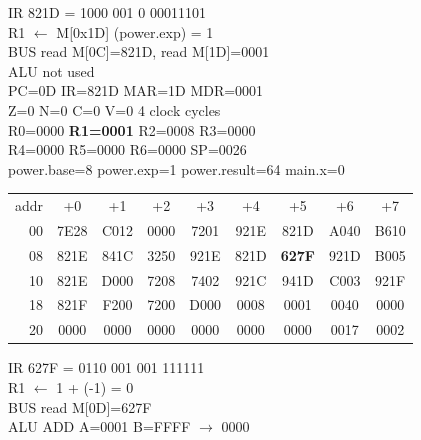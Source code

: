 \noindent\begin{tcolorbox}[stepbox, title={Step 28 \hfill PC 0C \quad LD R1, power.exp}]
\textcolor{dim}{IR} 821D = 1000 001 0 00011101\\
R1 $\leftarrow$ M[0x1D] (power.exp) = 1\\
\textcolor{dim}{BUS} read M[0C]=821D, read M[1D]=0001\\
\textcolor{dim}{ALU} \textcolor{dim}{not used}\\
PC=0D IR=821D MAR=1D MDR=0001\\
Z=0 N=0 C=0 V=0 \hfill \textcolor{dim}{4 clock cycles}\\
R0=0000 \textcolor{wrt}{\textbf{R1=0001}} R2=0008 R3=0000\\
R4=0000 R5=0000 R6=0000 SP=0026\\
\textcolor{dim}{power.base=8  power.exp=1  power.result=64  main.x=0}\\[1pt]
{\setlength{\tabcolsep}{1.6pt}\begin{tabular}{@{}r*{8}{c}@{}}
\textcolor{dim}{addr} & \textcolor{dim}{+0} & \textcolor{dim}{+1} & \textcolor{dim}{+2} & \textcolor{dim}{+3} & \textcolor{dim}{+4} & \textcolor{dim}{+5} & \textcolor{dim}{+6} & \textcolor{dim}{+7}\\
\textcolor{dim}{00} & 7E28 & C012 & 0000 & 7201 & 921E & 821D & A040 & B610\\
\textcolor{dim}{08} & 821E & 841C & 3250 & 921E & 821D & \cellcolor{pcc}\textbf{627F} & 921D & B005\\
\textcolor{dim}{10} & 821E & D000 & 7208 & 7402 & 921C & 941D & C003 & 921F\\
\textcolor{dim}{18} & 821F & F200 & 7200 & D000 & \cellcolor{datac}0008 & \cellcolor{datac}0001 & \cellcolor{datac}0040 & \cellcolor{datac}0000\\
\textcolor{dim}{20} & \cellcolor{stackc}0000 & \cellcolor{stackc}0000 & \cellcolor{stackc}0000 & \cellcolor{stackc}0000 & \cellcolor{stackc}0000 & \cellcolor{stackc}0000 & \cellcolor{stackc}0017 & \cellcolor{stackc}0002\\
\end{tabular}}
\end{tcolorbox}\hfill\begin{tcolorbox}[stepbox, title={Step 29 \hfill PC 0D \quad ADDI R1, R1, -1}]
\textcolor{dim}{IR} 627F = 0110 001 001 111111\\
R1 $\leftarrow$ 1 + (-1) = 0\\
\textcolor{dim}{BUS} read M[0D]=627F\\
\textcolor{dim}{ALU} ADD A=0001 B=FFFF $\rightarrow$ 0000\\

\end{tcolorbox}
